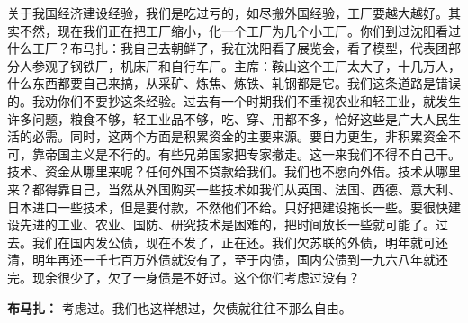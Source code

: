 \begin{list}{}
关于我国经济建设经验，我们是吃过亏的，如尽搬外国经验，工厂要越大越好。其实不然，现在我们正在把工厂缩小，化一个工厂为几个小工厂。你们到过沈阳看过什么工厂？布马扎：我自己去朝鲜了，我在沈阳看了展览会，看了模型，代表团部分人参观了钢铁厂，机床厂和自行车厂。主席：鞍山这个工厂太大了，十几万人，什么东西都要自己来搞，从采矿、炼焦、炼铁、轧钢都是它。我们这条道路是错误的。我劝你们不要抄这条经验。过去有一个时期我们不重视农业和轻工业，就发生许多问题，粮食不够，轻工业品不够，吃、穿、用都不多，恰好这些是广大人民生活的必需。同时，这两个方面是积累资金的主要来源。要自力更生，非积累资金不可，靠帝国主义是不行的。有些兄弟国家把专家撤走。这一来我们不得不自己干。技术、资金从哪里来呢？任何外国不贷款给我们。我们也不愿向外借。技术从哪里来？都得靠自己，当然从外国购买一些技术如我们从英国、法国、西德、意大利、日本进口一些技术，但是要付款，不然他们不给。只好把建设拖长一些。要很快建设先进的工业、农业、国防、研究技术是困难的，把时间放长一些就可能了。过去。我们在国内发公债，现在不发了，正在还。我们欠苏联的外债，明年就可还清，明年再还一千七百万外债就没有了，至于内债，国内公债到一九六八年就还完。现余很少了，欠了一身债是不好过。这个你们考虑过没有？

\item[\textbf{布马扎：}] 考虑过。我们也这样想过，欠债就往往不那么自由。


\end{list}
